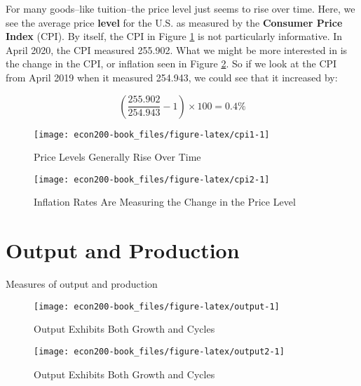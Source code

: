 \documentclass[
]{book}
\begin{document}
For many goods--like tuition--the price level just seems to rise over time. Here, we see the average price \textbf{level} for the U.S. as measured by the \textbf{Consumer Price Index} (CPI). By itself, the CPI in Figure \ref{fig:cpi1} is not particularly informative. In April 2020, the CPI measured 255.902. What we might be more interested in is the change in the CPI, or inflation seen in Figure \ref{fig:cpi2}. So if we look at the CPI from April 2019 when it measured 254.943, we could see that it increased by:

\[\left(\frac{255.902}{254.943} - 1\right)\times 100 = 0.4\%\]

\begin{figure}

{\centering \texttt{[image: econ200-book\_files/figure-latex/cpi1-1]} 

}

\caption{Price Levels Generally Rise Over Time}\label{fig:cpi1}
\end{figure}

\begin{figure}

{\centering \texttt{[image: econ200-book\_files/figure-latex/cpi2-1]} 

}

\caption{Inflation Rates Are Measuring the Change in the Price Level}\label{fig:cpi2}
\end{figure}

\hypertarget{production}{%
\chapter{Output and Production}\label{production}}

Measures of output and production

\begin{figure}

{\centering \texttt{[image: econ200-book\_files/figure-latex/output-1]} 

}

\caption{Output Exhibits Both Growth and Cycles}\label{fig:output}
\end{figure}

\begin{figure}

{\centering \texttt{[image: econ200-book\_files/figure-latex/output2-1]} 

}

\caption{Output Exhibits Both Growth and Cycles}\label{fig:output2}
\end{figure}
\end{document}

